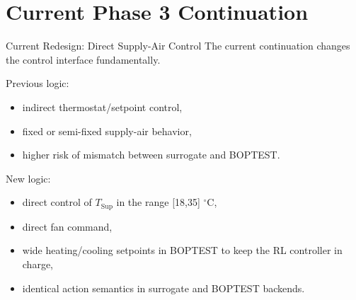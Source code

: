 \documentclass[aspectratio=169,11pt]{beamer}
\newcommand{\degc}{\ensuremath{^\circ\mathrm{C}}}
\begin{document}
\section{Current Phase 3 Continuation}

\begin{frame}{Current Redesign: Direct Supply-Air Control}
  The current continuation changes the control interface fundamentally.

  \vspace{0.5em}
  Previous logic:
  \begin{itemize}
    \item indirect thermostat/setpoint control,
    \item fixed or semi-fixed supply-air behavior,
    \item higher risk of mismatch between surrogate and BOPTEST.
  \end{itemize}

  New logic:
  \begin{itemize}
    \item direct control of $T_{\mathrm{Sup}}$ in the range [18,35] \degc{},
    \item direct fan command,
    \item wide heating/cooling setpoints in BOPTEST to keep the RL controller in charge,
    \item identical action semantics in surrogate and BOPTEST backends.
  \end{itemize}
\end{frame}
\end{document}
